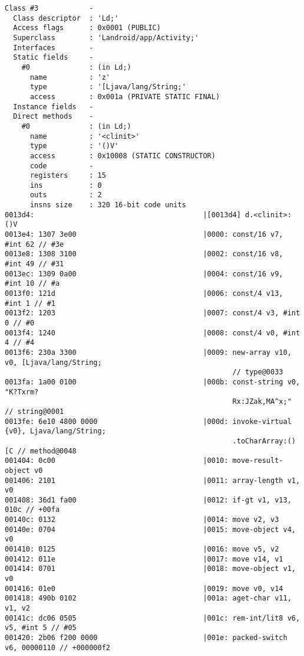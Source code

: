 \begin{lstlisting}
Class #3            -
  Class descriptor  : 'Ld;'
  Access flags      : 0x0001 (PUBLIC)
  Superclass        : 'Landroid/app/Activity;'
  Interfaces        -
  Static fields     -
    #0              : (in Ld;)
      name          : 'z'
      type          : '[Ljava/lang/String;'
      access        : 0x001a (PRIVATE STATIC FINAL)
  Instance fields   -
  Direct methods    -
    #0              : (in Ld;)
      name          : '<clinit>'
      type          : '()V'
      access        : 0x10008 (STATIC CONSTRUCTOR)
      code          -
      registers     : 15
      ins           : 0
      outs          : 2
      insns size    : 320 16-bit code units
0013d4:                                        |[0013d4] d.<clinit>:()V
0013e4: 1307 3e00                              |0000: const/16 v7, #int 62 // #3e
0013e8: 1308 3100                              |0002: const/16 v8, #int 49 // #31
0013ec: 1309 0a00                              |0004: const/16 v9, #int 10 // #a
0013f0: 121d                                   |0006: const/4 v13, #int 1 // #1
0013f2: 1203                                   |0007: const/4 v3, #int 0 // #0
0013f4: 1240                                   |0008: const/4 v0, #int 4 // #4
0013f6: 230a 3300                              |0009: new-array v10, v0, [Ljava/lang/String;
                                                      // type@0033
0013fa: 1a00 0100                              |000b: const-string v0, "K?Txrm?
                                                      Rx:JZak,MA^x;" // string@0001
0013fe: 6e10 4800 0000                         |000d: invoke-virtual {v0}, Ljava/lang/String;
                                                      .toCharArray:()[C // method@0048
001404: 0c00                                   |0010: move-result-object v0
001406: 2101                                   |0011: array-length v1, v0
001408: 36d1 fa00                              |0012: if-gt v1, v13, 010c // +00fa
00140c: 0132                                   |0014: move v2, v3
00140e: 0704                                   |0015: move-object v4, v0
001410: 0125                                   |0016: move v5, v2
001412: 011e                                   |0017: move v14, v1
001414: 0701                                   |0018: move-object v1, v0
001416: 01e0                                   |0019: move v0, v14
001418: 490b 0102                              |001a: aget-char v11, v1, v2
00141c: dc06 0505                              |001c: rem-int/lit8 v6, v5, #int 5 // #05
001420: 2b06 f200 0000                         |001e: packed-switch v6, 00000110 // +000000f2

\end{lstlisting}
